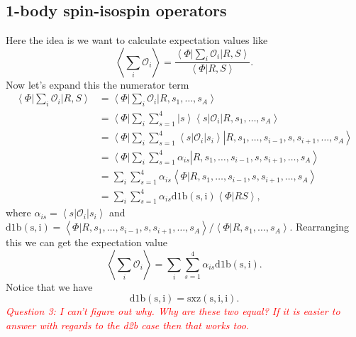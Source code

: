 \documentclass[12pt]{extarticle}
\newcommand{\Oi}{\mathcal{O}_{i}}
\newcommand{\ket}[1]{\left| #1 \right>}
\newcommand{\bra}[1]{\left< #1 \right|}
\newcommand{\braket}[2]{\left< #1 | #2 \right>}
\newcommand{\ketbra}[2]{\left| #1 \right> \left< #2 \right|}
\newcommand{\mycolor}[1]{\textit{\textcolor{red}{#1}}}
\newcommand{\longsi}{s_1, \ldots, s_{i-1} , s, s_{i+1}, \ldots, s_A}
\begin{document}
\subsection{1-body spin-isospin operators}
Here the idea is we want to calculate expectation values like
\begin{equation}
 \left< \sum_i \Oi \right> = \frac{\bra{\Phi} \sum\limits_i \Oi \ket{R,S}}{\braket{\Phi}{R,S}}.
\end{equation}
Now let's expand this the numerator term
\begin{align}
  \bra{\Phi} \sum_i \Oi \ket{R,S} &= \bra{\Phi} \sum_i \Oi \ket{R,s_1,\ldots,s_A} \\
  &= \bra{\Phi} \sum_i\sum_{s=1}^4  \ketbra{s}{s} \Oi \ket{R,s_1,\ldots,s_A} \\
  &= \bra{\Phi} \sum_i\sum_{s=1}^4  \bra{s}\Oi\ket{s_i} \ket{R,\longsi} \\
  &= \bra{\Phi} \sum_i\sum_{s=1}^4 \alpha_{is} \ket{R,\longsi} \\
  &= \sum_i\sum_{s=1}^4 \alpha_{is} \braket{\Phi}{R,\longsi} \\
  &= \sum_i\sum_{s=1}^4 \alpha_{is} \mathrm{d1b(s,i)} \braket{\Phi}{RS},
\end{align}
where $\alpha_{is} = \bra{s} \Oi \ket{s_i}$ and $\mathrm{d1b(s,i)} = \braket{\Phi}{R,\longsi}/\braket{\Phi}{R,s_1,\ldots,s_A}$. Rearranging this we can get the expectation value
\begin{equation}
  \left< \sum_i \Oi \right> = \sum_i \sum_{s=1}^4 \alpha_{is}\mathrm{d1b(s,i)}.
\end{equation}
Notice that we have
\begin{equation}
  \mathrm{d1b(s,i) = sxz(s,i,i)}.
\end{equation}
\mycolor{Question 3: I can't figure out why. Why are these two equal? If it is easier to answer with regards to the d2b case then that works too.}
\end{document}
